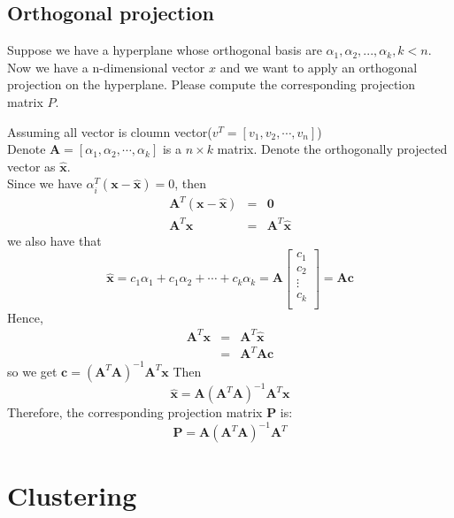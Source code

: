 \documentclass{article}
\newenvironment{answer}{\par\color{ForestGreen}}{\par}
\newcommand{\A}{\mathbf{A}}
\newcommand{\x}{\mathbf{x}}
\begin{document}
\subsection{Orthogonal projection}
Suppose we have a hyperplane whose orthogonal basis are $\alpha_1, \alpha_2, ... , \alpha_k, k < n$. Now
we have a n-dimensional vector $x$ and we want to apply an orthogonal projection on the
hyperplane. Please compute the corresponding projection matrix $P$.
\begin{answer}
  Assuming all vector is cloumn vector($v^T = [v_1, v_2, \cdots, v_n]$)\\

  Denote $\A = [\alpha_1, \alpha_2, \cdots, \alpha_k]$ is a $n\times k$ matrix. Denote the orthogonally projected vector as $\hat{\x}$. \\
  Since we have $\alpha_i^T(\x - \hat{\x})=0$, then
  \begin{eqnarray*}
     \A^T(\x-\hat{\x}) &=& \textbf{0} \\
     \A^T \x &=& \A^T \hat{\x}
  \end{eqnarray*}
  we also have that
  $$\hat{\x} = c_1\alpha_1 + c_1\alpha_2 + \cdots + c_k\alpha_k = \A \begin{bmatrix}
                                                                         c_1 \\
                                                                         c_2 \\
                                                                         \vdots \\
                                                                         c_k \\
                                                                       \end{bmatrix} = \A\mathbf{c}$$
  Hence,
  \begin{eqnarray*}
     \A^T \x &=& \A^T \hat{\x} \\
     &=& \A^T\A\mathbf{c}
  \end{eqnarray*}
  so we get $\mathbf{c} = (\A^T\A)^{-1}\A^T\x$
  Then $$\hat{\x} = \A(\A^T\A)^{-1}\A^T\x$$
  Therefore, the corresponding projection matrix $\mathbf{P}$ is:
  $$\mathbf{P} = \A(\A^T\A)^{-1}\A^T$$
\end{answer}

\section{Clustering}
\end{document}
